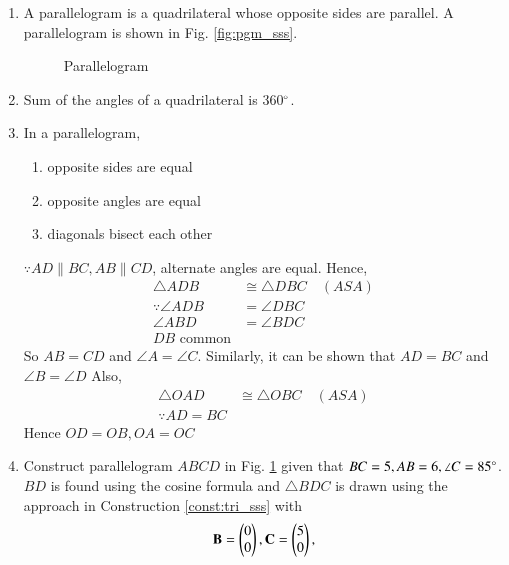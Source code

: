 \renewcommand{\theequation}{\theenumi}
\begin{enumerate}[label=\arabic*.,ref=\thesubsection.\theenumi]
\item A parallelogram is a quadrilateral whose opposite sides are parallel. A parallelogram is shown in Fig. \eqref{fig:pgm_sss}.	

%
\begin{figure}[!ht]
	\begin{center}
		\resizebox{\columnwidth}{!}{}
	\end{center}
	\caption{Parallelogram}
	\label{fig:pgm_sas}	
\end{figure}

\item Sum of the angles of a quadrilateral is 360$\degree$. 
\item  In a parallelogram, 
\label{them:pgm_basic}
\begin{enumerate}
\item opposite sides are equal 
\item  opposite angles are equal
\item  diagonals bisect each other
\end{enumerate}
\solution $\because AD \parallel BC, AB \parallel CD$, alternate angles are equal.  Hence, 
%
\begin{align}
\triangle ADB &\cong \triangle  DBC \quad (ASA)
\\
\because \angle ADB &= \angle DBC
\\
\angle ABD &= \angle BDC
\\
DB \text{ common}
\end{align}
%
So $AB = CD$ and $\angle A = \angle C$.  Similarly, it can be shown that $AD = BC$ and $\angle B = \angle D$
Also, 
%
\begin{align}
\triangle OAD &\cong \triangle  OBC \quad (ASA)
\\
\because AD = BC
\end{align}
%
Hence $OD = OB, OA=OC$
\item Construct parallelogram $ABCD$ 	in Fig. \ref{fig:pgm_sas}	
given that  $BC = 5, AB = 6, \angle C = 85 \degree$.
\\
\solution $BD$ is found using the cosine formula and $\triangle BDC$ is drawn using the approach in Construction \ref{const:tri_sss} with 
%
\begin{align}
\vec{B} = \myvec{0\\0},
\vec{C} = \myvec{5\\0},

\end{align}
\end{enumerate}
